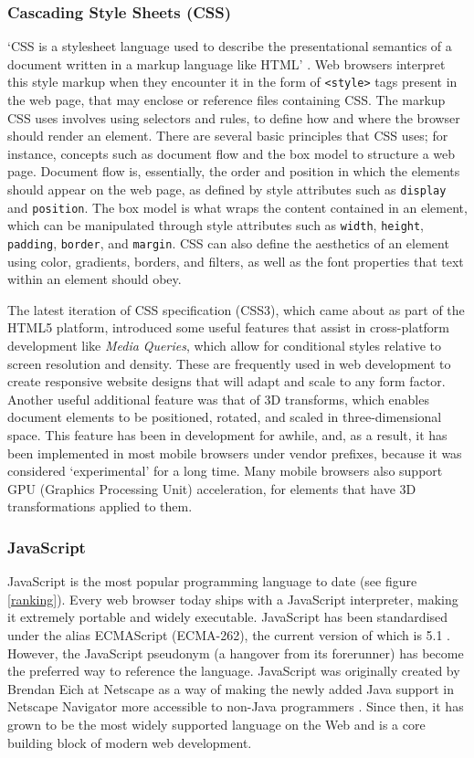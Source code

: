 \documentclass[final]{cmpreport}
\begin{document}
\subsubsection{Cascading Style Sheets (CSS)}
`CSS is a stylesheet language used to describe the presentational semantics of a document written in a markup language like HTML' \citep{Neilson}. Web browsers interpret this style markup when they encounter it in the form of \texttt{<style>} tags present in the web page, that may enclose or reference files containing CSS. The markup CSS uses involves using selectors and rules, to define how and where the browser should render an element. There are several basic principles that CSS uses; for instance, concepts such as document flow and the box model to structure a web page. Document flow is, essentially, the order and position in which the elements should appear on the web page, as defined by style attributes such as \texttt{display} and \texttt{position}. The box model is what wraps the content contained in an element, which can be manipulated through style attributes such as \texttt{width}, \texttt{height}, \texttt{padding}, \texttt{border}, and \texttt{margin}. CSS can also define the aesthetics of an element using color, gradients, borders, and filters, as well as the font properties that text within an element should obey.

The latest iteration of CSS specification (CSS3), which came about as part of the HTML5 platform, introduced some useful features that assist in cross-platform development like \textit{Media Queries}, which allow for conditional styles relative to screen resolution and density. These are  frequently used in web development to create responsive website designs that will adapt and scale to any form factor. Another useful additional feature was that of 3D transforms,  which enables document elements to be positioned, rotated, and scaled in three-dimensional space. This feature has been in development for awhile, and, as a result, it has been implemented in most mobile browsers under vendor prefixes, because it was considered `experimental' for a long time. Many mobile browsers also support GPU (Graphics Processing Unit) acceleration, for elements that have 3D transformations applied to them.

\subsubsection{JavaScript}
JavaScript is the most popular programming language to date (see figure \ref{ranking}). Every web browser today ships with a JavaScript interpreter, making it extremely portable and widely executable. JavaScript has been standardised under the alias ECMAScript (ECMA-262), the current version of which is 5.1 \footnotemark . However, the JavaScript pseudonym (a hangover from its forerunner) has become the preferred way to reference the language. JavaScript was originally created by Brendan Eich at Netscape as a way of making the newly added Java support in Netscape Navigator more accessible to non-Java programmers \citep{Champeon}. Since then, it has grown to be the most widely supported  language on the Web and is a core building block of modern web development.
\end{document}
